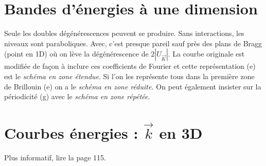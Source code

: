	\section{Bandes d'énergies à une dimension}
	Seule les doubles dégénérescences peuvent se produire. Sans interactions, les 
	niveaux sont paraboliques. Avec, c'est presque pareil sauf près des plans de 
	Bragg (point en 1D) où on lève la dégénérescence de $2|U_{\vec{K}}|$. La courbe 
	originale est modifiée de façon à inclure ces coefficients de Fourier et cette 
	représentation (e) est le \textit{schéma en zone étendue}. Si l'on les représente 
	tous dans la première zone de Brillouin (e) on a le \textit{schéma en zone 
	réduite.} On peut également insister sur la périodicité (g) avec le \textit{schéma 
	en zone répétée}.
	
	\section{Courbes énergies : $\vec{k}$ en 3D}
	Plus informatif, lire la page 115.
	
